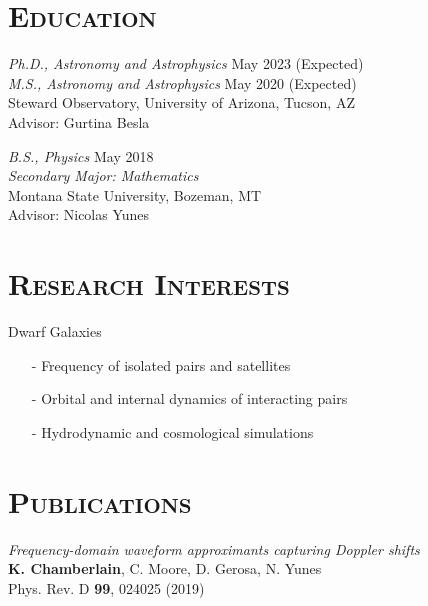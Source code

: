 \documentclass[margin]{res}
\begin{document}
\begin{resume}

\section{\textsc{Education}}

{\sl Ph.D., Astronomy and Astrophysics} \hfill        May 2023 (Expected)\\
{\sl M.S., Astronomy and Astrophysics} \hfill        May 2020 (Expected)\\
Steward Observatory, University of Arizona, Tucson, AZ\\
Advisor: Gurtina Besla


{\sl B.S., Physics} \hfill        May 2018 \\
\textit{Secondary Major: Mathematics}\\
Montana State University, Bozeman, MT\\
Advisor: Nicolas Yunes

 
\bigskip
\section{\textsc{Research Interests}}
Dwarf Galaxies 

\begin{itemize}
\item[-] Frequency of isolated pairs and satellites 
\item[-] Orbital and internal dynamics of interacting pairs
\item[-] Hydrodynamic and cosmological simulations
\end{itemize}
\bigskip

\section{\textsc{Publications}}
\emph{Frequency-domain waveform approximants capturing Doppler shifts}\\
\textbf{K. Chamberlain}, C. Moore, D. Gerosa, N. Yunes\\
Phys. Rev. D \textbf{99}, 024025 (2019)


\end{resume}
\end{document}
